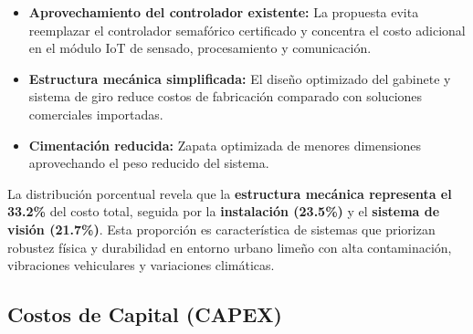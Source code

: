 \documentclass[12pt,a4paper,oneside]{report}
\begin{document}
\begin{itemize}
\item
  \textbf{Aprovechamiento del controlador existente:} La propuesta evita reemplazar el controlador semafórico certificado y concentra el costo adicional en el módulo IoT de sensado, procesamiento y comunicación.
\end{itemize}

\begin{itemize}
\item
  \textbf{Estructura mecánica simplificada:} El diseño optimizado del gabinete y sistema de giro reduce costos de fabricación comparado con soluciones comerciales importadas.
\end{itemize}

\begin{itemize}
\item
  \textbf{Cimentación reducida:} Zapata optimizada de menores dimensiones aprovechando el peso reducido del sistema.
\end{itemize}

La distribución porcentual revela que la \textbf{estructura mecánica representa el 33.2\%} del costo total, seguida por la \textbf{instalación (23.5\%)} y el \textbf{sistema de visión (21.7\%)}. Esta proporción es característica de sistemas que priorizan robustez física y durabilidad en entorno urbano limeño con alta contaminación, vibraciones vehiculares y variaciones climáticas.

\subsection{Costos de Capital (CAPEX)}\label{costos-de-capital-capex}

\label{tbl:7.1}
\end{document}
